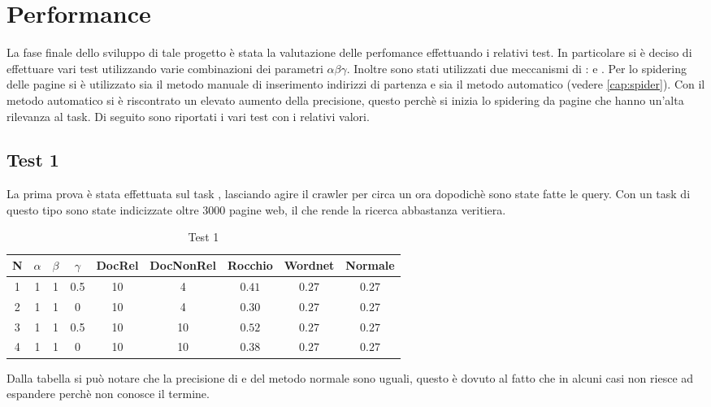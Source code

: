 \chapter{Performance}
La fase finale dello sviluppo di tale progetto è stata la valutazione delle perfomance effettuando i relativi test. In particolare si è deciso di effettuare vari test utilizzando varie combinazioni dei parametri $\alpha \beta \gamma$. Inoltre sono stati utilizzati due meccanismi di :  e . Per lo spidering delle pagine si è utilizzato sia il metodo manuale di inserimento indirizzi di partenza e sia il metodo automatico (vedere \ref{cap:spider}). Con il metodo automatico si è riscontrato un elevato aumento della precisione, questo perchè si inizia lo spidering da pagine che hanno un'alta rilevanza al task.
Di seguito sono riportati i vari test con i relativi valori.
\section{Test 1}
La prima prova è stata effettuata sul task , lasciando agire il crawler per circa un ora dopodichè sono state fatte le query. Con un task di questo tipo sono state indicizzate oltre 3000 pagine web, il che rende la ricerca abbastanza veritiera.
\begin{table}[H]
\begin{center}
\begin{tabular}{||c|c|c|c|c|c|c|c|c||}
\hline
N	&$\alpha$	&$\beta$	&$\gamma$	&DocRel		&DocNonRel	&Rocchio	&Wordnet	&Normale	\\
\hline
\hline
1	&1			&1			&0.5		&10			&4			&$0.41$		&$0.27$		&$0.27$	\\
\hline
2	&1			&1			&0			&10			&4			&$0.30$		&$0.27$		&$0.27$	\\
\hline
3	&1			&1			&0.5		&10			&10			&$0.52$		&$0.27$		&$0.27$	\\
\hline
4	&1			&1			&0			&10			&10			&$0.38$		&$0.27$		&$0.27$	\\
\hline
\end{tabular}
\end{center}
\caption{Test 1}
\label{test_1}
\end{table}
Dalla tabella si può notare che la precisione di  e del metodo normale sono uguali, questo è dovuto al fatto che  in alcuni casi non riesce ad espandere perchè non conosce il termine.
